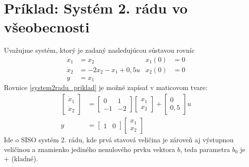 \documentclass[a4paper, 10pt, ]{article}
\begin{document}
\section{Príklad: Systém 2. rádu vo všeobecnosti}


Uvažujme systém, ktorý je zadaný nasledujúcou sústavou rovníc
\begin{subequations} \label{system2radu_priklad}
\begin{align}
	\dot x_1 &= x_2  &  x_1(0) &=0 \\
	\dot x_2 &= -2 x_2 - x_1 + 0,5 u &  x_2(0)&=0 \\
	y &= x_1
\end{align}
\end{subequations}
Rovnice \eqref{system2radu_priklad} je možné zapísať v maticovom tvare:
\begin{subequations} \label{maticformasystemu2r_priklad}
	\begin{align}
	\begin{bmatrix}
	 		\dot x_1  \\
	 		\dot x_2
	 \end{bmatrix}
	 &=
	 \begin{bmatrix}
	 		0 & 1 \\
	 		-1 & -2
	 \end{bmatrix}
	 \begin{bmatrix}
	 		x_1  \\
	 		x_2
	 \end{bmatrix}
	 +
	 \begin{bmatrix}
	 		0  \\
	 		0,5
	 \end{bmatrix}
	 u
	 \\
	 y
	 &=
	 \begin{bmatrix}
	 		1  &
	 		0
	 \end{bmatrix}
	 \begin{bmatrix}
	 		x_1  \\
	 		x_2
	 \end{bmatrix}
	\end{align}
\end{subequations}
Ide o SISO systém 2. rádu, kde prvá stavová veličina je zároveň aj výstupnou veličinou a znamienko jediného nenulového prvku vektora $b$, teda parametra $b_0$ je $+$ (kladné).
\end{document}
